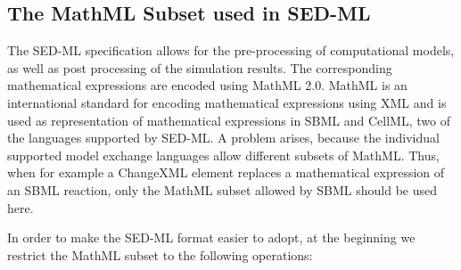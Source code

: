 \label{sec:mathML}
\subsection{The MathML Subset used in SED-ML}
The SED-ML specification allows for the pre-processing of computational models, 
as well as post processing of the simulation results. The corresponding 
mathematical expressions are encoded using MathML 2.0. MathML is an 
international standard for encoding mathematical expressions using XML and is 
used as representation of mathematical expressions in SBML and CellML, two of 
the languages supported by SED-ML. A problem arises, because the individual 
supported model exchange languages allow different subsets of MathML. Thus, 
when for example a ChangeXML element replaces a mathematical expression of  an 
SBML reaction, only the MathML subset allowed by SBML should be used here. 

In order to make the SED-ML format easier to adopt, at the beginning we 
restrict the MathML subset to the following operations: 

